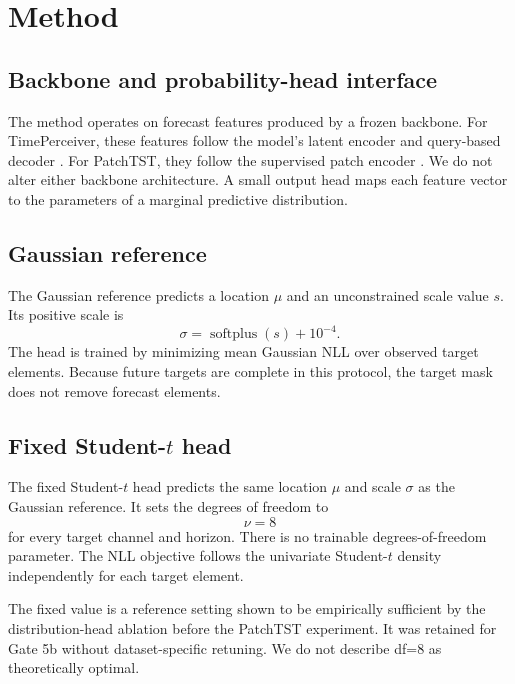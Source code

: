 \section{Method}
\label{sec:method}

\subsection{Backbone and probability-head interface}

The method operates on forecast features produced by a frozen backbone. For TimePerceiver, these features follow the model's latent encoder and query-based decoder \cite{lee2025timeperceiver}. For PatchTST, they follow the supervised patch encoder \cite{nie2023patchtst}. We do not alter either backbone architecture. A small output head maps each feature vector to the parameters of a marginal predictive distribution.

\subsection{Gaussian reference}

The Gaussian reference predicts a location $\mu$ and an unconstrained scale value $s$. Its positive scale is
\begin{equation}
    \sigma = \operatorname{softplus}(s) + 10^{-4}.
    \label{eq:scale}
\end{equation}
The head is trained by minimizing mean Gaussian NLL over observed target elements. Because future targets are complete in this protocol, the target mask does not remove forecast elements.

\subsection{\texorpdfstring{Fixed Student-$t$ head}{Fixed Student-t head}}

The fixed Student-$t$ head predicts the same location $\mu$ and scale $\sigma$ as the Gaussian reference. It sets the degrees of freedom to
\begin{equation}
    \nu = 8
    \label{eq:fixed-df}
\end{equation}
for every target channel and horizon. There is no trainable degrees-of-freedom parameter. The NLL objective follows the univariate Student-$t$ density independently for each target element.

The fixed value is a reference setting shown to be empirically sufficient by the distribution-head ablation before the PatchTST experiment. It was retained for Gate 5b without dataset-specific retuning. We do not describe df=8 as theoretically optimal.

